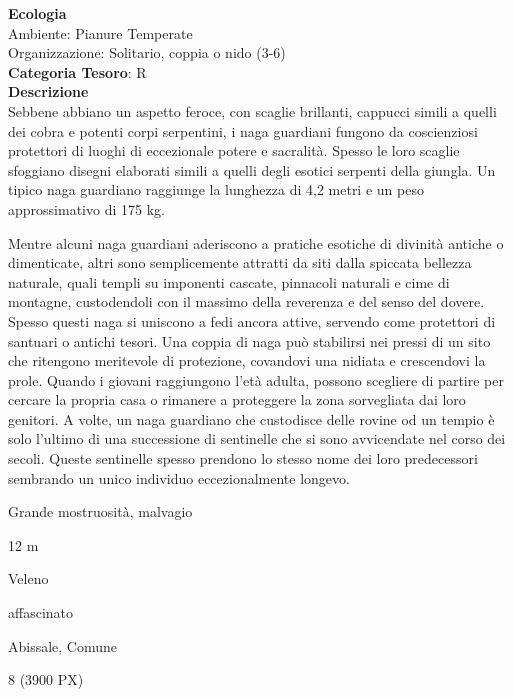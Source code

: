 \begin{multicols}{2}
{\textbf{Ecologia}\\
Ambiente: Pianure Temperate\\
Organizzazione: Solitario, coppia o nido (3-6)\\
\textbf{Categoria Tesoro}: R\\
\textbf{Descrizione}\\
Sebbene abbiano un aspetto feroce, con scaglie brillanti, cappucci simili a quelli dei cobra e potenti corpi serpentini, i naga guardiani fungono da coscienziosi protettori di luoghi di eccezionale potere e sacralità. Spesso le loro scaglie sfoggiano disegni elaborati simili a quelli degli esotici serpenti della giungla. Un tipico naga guardiano raggiunge la lunghezza di 4,2 metri e un peso approssimativo di 175 kg.

Mentre alcuni naga guardiani aderiscono a pratiche esotiche di divinità antiche o dimenticate, altri sono semplicemente attratti da siti dalla spiccata bellezza naturale, quali templi su imponenti cascate, pinnacoli naturali e cime di montagne, custodendoli con il massimo della reverenza e del senso del dovere. Spesso questi naga si uniscono a fedi ancora attive, servendo come protettori di santuari o antichi tesori. Una coppia di naga può stabilirsi nei pressi di un sito che ritengono meritevole di protezione, covandovi una nidiata e crescendovi la prole. Quando i giovani raggiungono l'età adulta, possono scegliere di partire per cercare la propria casa o rimanere a proteggere la zona sorvegliata dai loro genitori. A volte, un naga guardiano che custodisce delle rovine od un tempio è solo l'ultimo di una successione di sentinelle che si sono avvicendate nel corso dei secoli. Queste sentinelle spesso prendono lo stesso nome dei loro predecessori sembrando un unico individuo eccezionalmente longevo.

\begin{description}[noitemsep, topsep=0pt, parsep=0pt, partopsep=0pt, itemsep=1pt, leftmargin=2.35cm,  labelwidth=2.2cm, itemindent=0cm, listparindent=0pt] %
\setlength{\baselineskip}{10pt}
\item[\textbf{Taglia/Tipo}] Grande mostruosità, malvagio
\item[\textbf{Caratt.}] 
\item[\textbf{Punti Ferita}] 
\item[\textbf{Movimento}] 12 m
\item[\textbf{Tiri Salvez.}] 
\item[\textbf{Imm. Danni}] Veleno
\item[\textbf{Immunità}] affascinato
\item[\textbf{Sensi}] 
\item[\textbf{Linguaggi}] Abissale, Comune
\item[\textbf{Sfida}] 8 (3900 PX)
\end{description}
\smallskip

}
\end{multicols}
